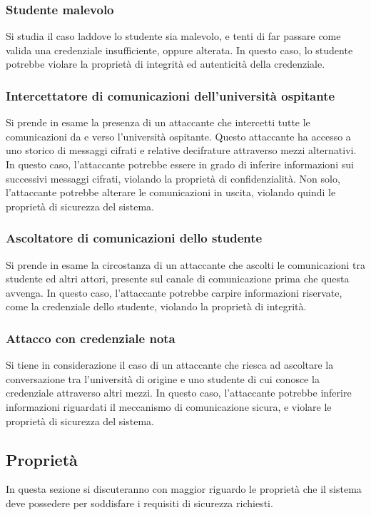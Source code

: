 \documentclass[a4paper,12pt]{article}
\begin{document}
\subsubsection{Studente malevolo}
Si studia il caso laddove lo studente sia malevolo, e tenti di far passare come valida una credenziale insufficiente, oppure alterata. In questo caso, lo studente potrebbe violare la proprietà di integrità ed autenticità della credenziale.
\subsubsection{Intercettatore di comunicazioni dell'università ospitante}
Si prende in esame la presenza di un attaccante che intercetti tutte le comunicazioni da e verso l'università ospitante. Questo attaccante ha accesso a uno storico di messaggi cifrati e relative decifrature attraverso mezzi alternativi. 
\newline In questo caso, l'attaccante potrebbe essere in grado di inferire informazioni sui successivi messaggi cifrati, violando la proprietà di confidenzialità. Non solo, l'attaccante potrebbe alterare le comunicazioni in uscita, violando quindi le proprietà di sicurezza del sistema.
\subsubsection{Ascoltatore di comunicazioni dello studente}
Si prende in esame la circostanza di un attaccante che ascolti le comunicazioni tra studente ed altri attori, presente sul canale di comunicazione prima che questa avvenga. In questo caso, l'attaccante potrebbe carpire informazioni riservate, come la credenziale dello studente, violando la proprietà di integrità.
\subsubsection{Attacco con credenziale nota}
Si tiene in considerazione il caso di un attaccante che riesca ad ascoltare la conversazione tra l'università di origine e uno studente di cui conosce la credenziale attraverso altri mezzi.
\newline In questo caso, l'attaccante potrebbe inferire informazioni riguardati il meccanismo di comunicazione sicura, e violare le proprietà di sicurezza del sistema. 

\subsection{Proprietà}
In questa sezione si discuteranno con maggior riguardo le proprietà che il sistema deve possedere per soddisfare i requisiti di sicurezza richiesti.
\end{document}
